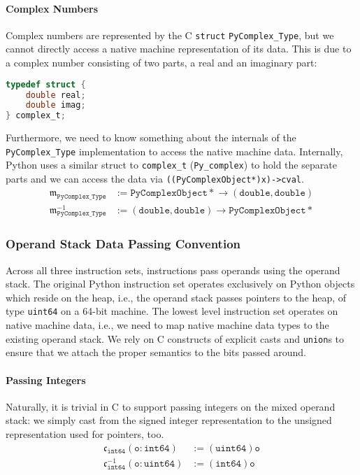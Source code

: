 \documentclass[preprint,10pt]{popl14conf}
\newcommand{\pyType}[1]{\texttt{Py#1\_Type}}
\begin{document}
\paragraph{Complex Numbers}
Complex numbers are represented by the C \texttt{struct} \pyType{Complex}, but we cannot directly
access a native machine representation of its data.
This is due to a complex number consisting of two parts, a real and an imaginary part:
\begin{lstlisting}[language=C,style=othercode]
typedef struct {
    double real;
    double imag;
} complex_t;
\end{lstlisting}
Furthermore, we need to know something about the internals of the \pyType{Complex} implementation to
access the native machine data.
Internally, Python uses a similar struct to \texttt{complex_t} (\texttt{Py_complex}) to hold the
separate parts and we can access the data via \texttt{((PyComplexObject*)x)->cval}.
\begin{align*}
  \mathfrak{m}_{\mathtt{PyComplex\_Type}} & := \mathtt{PyComplexObject*} \rightarrow (\mathtt{double}, \mathtt{double}) \\
  \mathfrak{m}_{\mathtt{PyComplex\_Type}}^{-1} & := (\mathtt{double}, \mathtt{double}) \rightarrow \mathtt{PyComplexObject*}
\end{align*}


\subsubsection{Operand Stack Data Passing Convention}

Across all three instruction sets, instructions pass operands using the operand stack.
The original Python instruction set operates exclusively on Python objects which reside on the heap,
i.e., the operand stack passes pointers to the heap, of type \texttt{uint64} on a 64-bit machine.
The lowest level instruction set operates on native machine data, i.e., we need to map native
machine data types to the existing operand stack.
We rely on C constructs of explicit casts and \texttt{union}s to ensure that we attach the proper
semantics to the bits passed around.

\paragraph{Passing Integers}
Naturally, it is trivial in C to support passing integers on the mixed operand stack: we simply cast
from the signed integer representation to the unsigned representation used for pointers, too.
\begin{align*}
  \mathfrak{c}_{\mathtt{int64}}(\mathtt{o}: \mathtt{int64})      & := \mathtt{(uint64)o} \\
  \mathfrak{c}_{\mathtt{int64}}^{-1}(\mathtt{o}: \mathtt{uint64}) & := \mathtt{(int64)o}
\end{align*}
\end{document}
